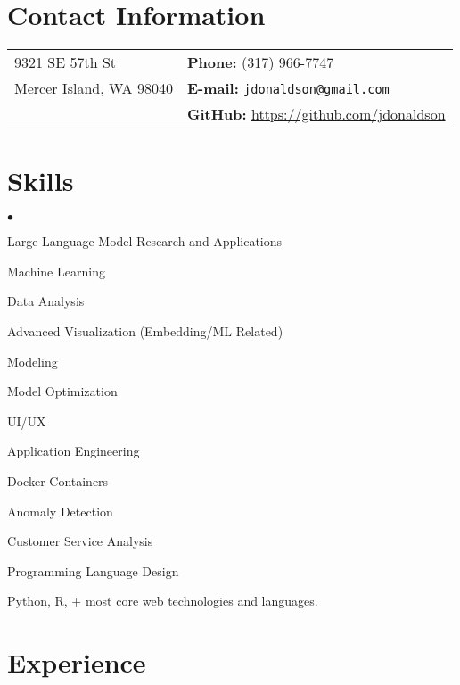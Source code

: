 \documentclass[margin,line]{res}
\newenvironment{list2}{
  \begin{list}{$\bullet$}{%
      \setlength{\itemsep}{0in}
      \setlength{\parsep}{0in} \setlength{\parskip}{0in}
      \setlength{\topsep}{0in} \setlength{\partopsep}{0in} 
      \setlength{\leftmargin}{0.2in}}}{\end{list}}
\begin{document}
\address{\large ML/DS/Engineering Entrepeneur}
\address{\large Above Ventures, LLC}

\begin{resume}
\section{\sc Contact Information}
\vspace{.05in}
\begin{tabular}{@{}p{3in}p{4in}}
9321 SE 57th St          & {\bf Phone:}   (317) 966-7747 \\
Mercer Island, WA 98040  & {\bf E-mail:}  {\tt jdonaldson@gmail.com} \\
                         & {\bf GitHub:} \url{https://github.com/jdonaldson} \\
\end{tabular}


\section{\sc Skills}
\begin{list2}
\item Large Language Model Research and Applications
\item Machine Learning
\item Data Analysis
\item Advanced Visualization (Embedding/ML Related)
\item Modeling
\item Model Optimization
\item UI/UX
\item Application Engineering
\item Docker Containers
\item Anomaly Detection
\item Customer Service Analysis
\item Programming Language Design
\item Python, R,  + most core web technologies and languages.
\end{list2}

\section{\sc Experience}


\end{resume}
\end{document}
